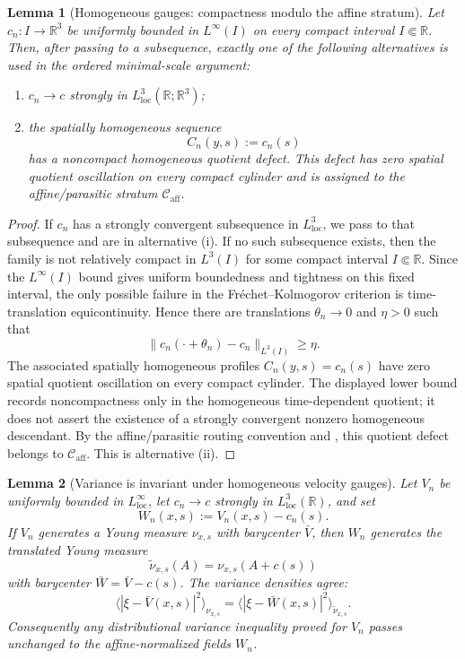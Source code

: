 \documentclass[11pt]{amsart}
\numberwithin{equation}{section}
\theoremstyle{plain}
\newtheorem{lemma}[lemma]{Lemma}
\theoremstyle{definition}
\theoremstyle{remark}
\newcommand{\loc}{\mathrm{loc}}
\newcommand{\Caff}{\mathcal C_{\mathrm{aff}}}
\begin{document}
\begin{lemma}[Homogeneous gauges: compactness modulo the affine stratum]
\label{lem:homogeneous-gauge-compactness}
Let \(c_n:I\to\mathbb R^3\) be uniformly bounded in \(L^\infty(I)\) on every
compact interval \(I\Subset\mathbb R\).  Then, after passing to a subsequence,
exactly one of the following alternatives is used in the ordered minimal-scale
argument:
\begin{enumerate}[label=\textup{(\roman*)}]
   \item \(c_n\to c\) strongly in \(L^3_{\loc}(\mathbb R;\mathbb R^3)\);
   \item the spatially homogeneous sequence
   \[
      C_n(y,s):=c_n(s)
   \]
   has a noncompact homogeneous quotient defect.  This defect has zero spatial
   quotient oscillation on every compact cylinder and is assigned to the
   affine/parasitic stratum \(\Caff\).
\end{enumerate}
\end{lemma}

\begin{proof}
If \(c_n\) has a strongly convergent subsequence in \(L^3_{\loc}\), we pass to
that subsequence and are in alternative \textup{(i)}.  If no such subsequence
exists, then the family is not relatively compact in \(L^3(I)\) for some
compact interval \(I\Subset\mathbb R\).  Since the \(L^\infty(I)\) bound gives
uniform boundedness and tightness on this fixed interval, the only possible
failure in the Fr\'echet--Kolmogorov criterion is time-translation
equicontinuity.  Hence there are translations \(\theta_n\to0\) and
\(\eta>0\) such that
\[
   \|c_n(\cdot+\theta_n)-c_n\|_{L^3(I)}\ge\eta .
\]
The associated spatially homogeneous profiles \(C_n(y,s)=c_n(s)\) have zero
spatial quotient oscillation on every compact cylinder.  The displayed lower
bound records noncompactness only in the homogeneous time-dependent quotient;
it does not assert the existence of a strongly convergent nonzero homogeneous
descendant.  By the affine/parasitic routing convention and
, this quotient defect belongs
to \(\Caff\).  This is alternative \textup{(ii)}.
\end{proof}

\begin{lemma}[Variance is invariant under homogeneous velocity gauges]
\label{lem:variance-homogeneous-shift}
Let \(V_n\) be uniformly bounded in \(L^\infty_{\loc}\), let
\(c_n\to c\) strongly in \(L^3_{\loc}(\mathbb R)\), and set
\[
   W_n(x,s):=V_n(x,s)-c_n(s).
\]
If \(V_n\) generates a Young measure \(\nu_{x,s}\) with barycenter
\(\bar V\), then \(W_n\) generates the translated Young measure
\[
   \widetilde\nu_{x,s}(A)=\nu_{x,s}(A+c(s))
\]
with barycenter \(\bar W=\bar V-c(s)\).  The variance densities agree:
\[
   \langle|\xi-\bar V(x,s)|^2\rangle_{\nu_{x,s}}
   =
   \langle|\xi-\bar W(x,s)|^2\rangle_{\widetilde\nu_{x,s}} .
\]
Consequently any distributional variance inequality proved for \(V_n\) passes
unchanged to the affine-normalized fields \(W_n\).
\end{lemma}
\end{document}
